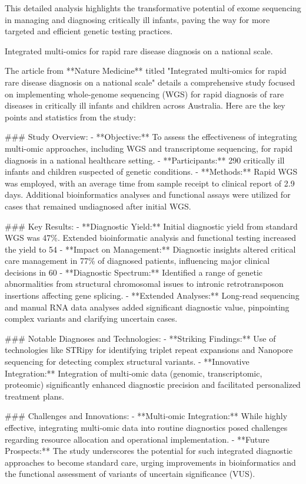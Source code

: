 This detailed analysis highlights the transformative potential of exome sequencing in managing and diagnosing critically ill infants, paving the way for more targeted and efficient genetic testing practices.

\citep{lunke2023integrated}
Integrated multi-omics for rapid rare disease diagnosis on a national scale.
  
  The article from **Nature Medicine** titled "Integrated multi-omics for rapid rare disease diagnosis on a national scale" details a comprehensive study focused on implementing whole-genome sequencing (WGS) for rapid diagnosis of rare diseases in critically ill infants and children across Australia. Here are the key points and statistics from the study:

### Study Overview:
- **Objective:** To assess the effectiveness of integrating multi-omic approaches, including WGS and transcriptome sequencing, for rapid diagnosis in a national healthcare setting.
- **Participants:** 290 critically ill infants and children suspected of genetic conditions.
- **Methods:** Rapid WGS was employed, with an average time from sample receipt to clinical report of 2.9 days. Additional bioinformatics analyses and functional assays were utilized for cases that remained undiagnosed after initial WGS.

### Key Results:
- **Diagnostic Yield:** Initial diagnostic yield from standard WGS was 47\%. Extended bioinformatic analysis and functional testing increased the yield to 54%
- **Impact on Management:** Diagnostic insights altered critical care management in 77\% of diagnosed patients, influencing major clinical decisions in 60%
- **Diagnostic Spectrum:** Identified a range of genetic abnormalities from structural chromosomal issues to intronic retrotransposon insertions affecting gene splicing.
- **Extended Analyses:** Long-read sequencing and manual RNA data analyses added significant diagnostic value, pinpointing complex variants and clarifying uncertain cases.

### Notable Diagnoses and Technologies:
- **Striking Findings:** Use of technologies like STRipy for identifying triplet repeat expansions and Nanopore sequencing for detecting complex structural variants.
- **Innovative Integration:** Integration of multi-omic data (genomic, transcriptomic, proteomic) significantly enhanced diagnostic precision and facilitated personalized treatment plans.

### Challenges and Innovations:
- **Multi-omic Integration:** While highly effective, integrating multi-omic data into routine diagnostics posed challenges regarding resource allocation and operational implementation.
- **Future Prospects:** The study underscores the potential for such integrated diagnostic approaches to become standard care, urging improvements in bioinformatics and the functional assessment of variants of uncertain significance (VUS).

